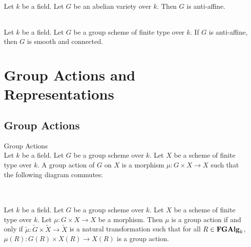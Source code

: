 \documentclass[a4paper]{article}
\begin{document}
\begin{lmm}{}{}\\
Let $k$ be a field. Let $G$ be an abelian variety over $k$. Then $G$ is anti-affine. 
\end{lmm}

\begin{prp}{}{}\\
Let $k$ be a field. Let $G$ be a group scheme of finite type over $k$. If $G$ is anti-affine, then $G$ is smooth and connected. 
\end{prp}


\pagebreak
\section{Group Actions and Representations}
\subsection{Group Actions}
\begin{defn}{Group Actions}{}\\
Let $k$ be a field. Let $G$ be a group scheme over $k$. Let $X$ be a scheme of finite type over $k$. A group action of $G$ on $X$ is a morphism $\mu:G\times X\to X$ such that the following diagram commutes: \\
 \\
\end{defn}

\begin{lmm}{}{}\\
Let $k$ be a field. Let $G$ be a group scheme over $k$. Let $X$ be a scheme of finite type over $k$. Let $\mu:G\times X\to X$ be a morphism. Then $\mu$ is a group action if and only if $\widetilde{\mu}:\widetilde{G}\times\widetilde{X}\to\widetilde{X}$ is a natural transformation such that for all $R\in\bold{FGAlg}_k$, $\mu(R):G(R)\times X(R)\to X(R)$ is a group action. 
\end{lmm}
\end{document}
